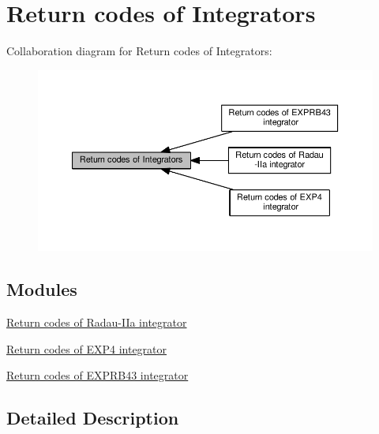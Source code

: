 \hypertarget{group__ErrorCodes}{}\section{Return codes of Integrators}
\label{group__ErrorCodes}
Collaboration diagram for Return codes of Integrators\+:
\nopagebreak
\begin{figure}[H]
\begin{center}
\leavevmode
\includegraphics[width=350pt]{group__ErrorCodes}
\end{center}
\end{figure}
\subsection*{Modules}
\begin{DoxyCompactItemize}
\item 
\hyperlink{group__RK__ErrCodes}{Return codes of Radau-\/\+I\+Ia integrator}
\item 
\hyperlink{group__exp4__ErrCodes}{Return codes of E\+X\+P4 integrator}
\item 
\hyperlink{group__exprb43__ErrCodes}{Return codes of E\+X\+P\+R\+B43 integrator}
\end{DoxyCompactItemize}


\subsection{Detailed Description}
